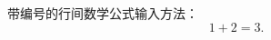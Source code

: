 \documentclass[a5paper,12pt]{ctexart}
\begin{document}
    带编号的行间数学公式输入方法：
    \begin{equation}
        1 + 2 = 3.
    \end{equation}
\end{document}
